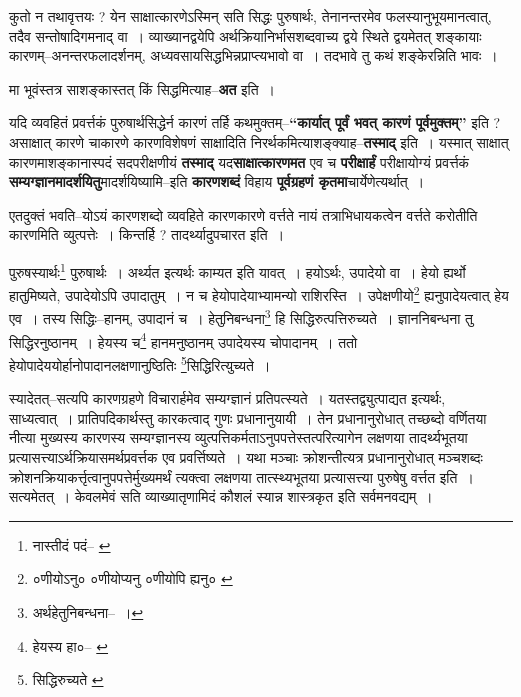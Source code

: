 \documentclass[article,12pt,a4paper]{memoir}
\begin{document}
	  \pstart कुतो न तथावृत्तयः ? येन साक्षात्कारणेऽस्मिन् सति सिद्धः पुरुषार्थः, तेनानन्तरमेव फलस्यानुभूयमानत्वात्, तदैव सन्तोषादिगमनाद् वा । व्याख्यानद्वयेपि अर्थक्रियानिर्भासशब्दवाच्य द्वये स्थिते द्वयमेतत् शङ्कायाः कारणम्--अनन्तरफलादर्शनम्, अध्यवसायसिद्धभिन्नप्राप्त्यभावो वा । तदभावे तु कथं शङ्केरन्निति भावः ।
	\pend
      

	  \pstart मा भूवंस्तत्र साशङ्कास्तत् किं सिद्धमित्याह--\textbf{अत} इति ।
	\pend
      

	  \pstart यदि व्यवहितं प्रवर्त्तकं पुरुषार्थसिद्धेर्न कारणं तर्हि कथमुक्तम्--\textbf{“कार्यात् पूर्वं भवत् कारणं पूर्वमुक्तम्”} इति ? असाक्षात् कारणे चाकारणे कारण\leavevmode{}विशेषणं साक्षादिति निरर्थकमित्याशङ्क्याह--\textbf{तस्माद्} इति । यस्मात् साक्षात् कारणमाशङ्कानास्पदं सदपरीक्षणीयं \textbf{तस्माद्} यद\textbf{साक्षात्कारणमत} एव च \textbf{परीक्षार्हं} परीक्षायोग्यं प्रवर्त्तकं \textbf{सम्यग्ज्ञानमादर्शयितु}मादर्शयिष्यामि--इति \textbf{कारणशब्दं} विहाय \textbf{पूर्वग्रहणं कृतमा}चार्येणेत्यर्थात् ।
	\pend
      

	  \pstart एतदुक्तं भवति--योऽयं कारणशब्दो व्यवहिते कारणकारणे वर्त्तते नायं तत्राभिधायकत्वेन वर्त्तते करोतीति कारणमिति व्युत्पत्तेः । किन्तर्हि ? तादर्थ्यादुपचारत इति ।
	\pend
      \leavevmode{}
	  \bigskip
	  \begingroup
	

	  \pstart पुरुषस्यार्थः\footnote{नास्तीदं पदं--\cite{dp-msA} \cite{dp-msB} \cite{dp-msD} \cite{dp-edP} \cite{dp-edH} \cite{dp-edE} \cite{dp-edN}} पुरुषार्थः । अर्थ्यत इत्यर्थः काम्यत इति यावत् । हयोऽर्थः, उपादेयो वा । हेयो ह्यर्थो हातुमिष्यते, उपादेयोऽपि उपादातुम् । न च हेयोपादेयाभ्यामन्यो राशिरस्ति । उपेक्षणीयो\footnote{०णीयोऽनु० \cite{dp-msA} ०णीयोप्यनु \cite{dp-msB} \cite{dp-edH} \cite{dp-edN} ०णीयोपि ह्यनु० \cite{dp-msC} \cite{dp-msD}} ह्यनुपादेयत्वात् हेय एव । तस्य सिद्धिः--हानम्, उपादानं च । हेतुनिबन्धना\footnote{अर्थहेतुनिबन्धना--\cite{dp-msD-n} ।} हि सिद्धिरुत्पत्तिरुच्यते । ज्ञाननिबन्धना तु सिद्धिरनुष्ठानम् । हेयस्य च\footnote{हेयस्य हा०--\cite{dp-msA} \cite{dp-msB} \cite{dp-edP} \cite{dp-edH} \cite{dp-edE} \cite{dp-edN}} हानमनुष्ठानम् उपादेयस्य चोपादानम् । ततो हेयोपादेययोर्हानोपादानलक्षणानुष्ठितिः \footnote{सिद्धिरुच्यते \cite{dp-msB}}सिद्धिरित्युच्यते ।
	\pend
      
	  \endgroup
	

	  \pstart स्यादेतत्--सत्यपि कारणग्रहणे विचारार्हमेव सम्यग्ज्ञानं प्रतिपत्स्यते । यतस्तद्व्युत्पाद्यत इत्यर्थः, साध्यत्वात् । प्रातिपदिकार्थस्तु कारकत्वाद् गुणः प्रधानानुयायी । तेन प्रधानानुरोधात् तच्छब्दो वर्णितया नीत्या मुख्यस्य कारणस्य सम्यग्ज्ञानस्य व्युत्पत्तिकर्मताऽनुपपत्तेस्तत्परित्यागेन लक्षणया तादर्थ्यभूतया प्रत्यासत्त्याऽर्थक्रियासमर्थप्रवर्त्तक एव प्रवर्त्तिष्यते । यथा मञ्चाः क्रोशन्तीत्यत्र प्रधानानुरोधात् मञ्चशब्दः क्रोशनक्रियाकर्त्तृत्वानुपपत्तेर्मुख्यमर्थं त्यक्त्वा लक्षणया तात्स्थ्यभूतया प्रत्यासत्त्या पुरुषेषु वर्त्तत इति । सत्यमेतत् । केवलमेवं सति व्याख्यातृणामिदं कौशलं स्यान्न शास्त्रकृत इति सर्वमनवद्यम् ।
	\pend
      
\end{document}
